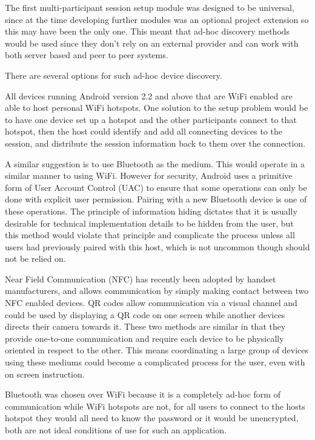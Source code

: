 The first multi-participant session setup module was designed to be universal, since at the time developing further modules was an optional project extension so this may have been the only one.
This meant that ad-hoc discovery methods would be used since they don't rely on an external provider and can work with both server based and peer to peer systems.

There are several options for such ad-hoc device discovery.

All devices running Android version 2.2 and above that are WiFi enabled are able to host personal WiFi hotspots. One solution to the setup problem would be to have one device set up a hotspot and the other participants connect to that hotspot, then the host could identify and add all connecting devices to the session, and distribute the session information back to them over the connection.



A similar suggestion is to use Bluetooth as the medium. This would operate in a similar manner to using WiFi. However for security, Android uses a primitive form of User Account Control (UAC) to ensure that some operations can only be done with explicit user permission. Pairing with a new Bluetooth device is one of these operations.\cite{btUAC} The principle of information hiding dictates that it is usually desirable for technical implementation details to be hidden from the user, but this method would violate that principle and complicate the process unless all users had previously paired with this host, which is not uncommon though should not be relied on.

Near Field Communication (NFC) has recently been adopted by handset manufacturers, and allows communication by simply making contact between two NFC enabled devices. QR codes allow communication via a visual channel and could be used by displaying a QR code on one screen while another devices directs their camera towards it. These two methods are similar in that they provide one-to-one communication and require each device to be physically oriented in respect to the other. This means coordinating a large group of devices using these mediums could become a complicated process for the user, even with on screen instruction.

Bluetooth was chosen over WiFi because it is a completely ad-hoc form of communication while WiFi hotspots are not, for all users to connect to the hosts hotspot they would all need to know the password or it would be unencrypted, both are not ideal conditions of use for such an application.

